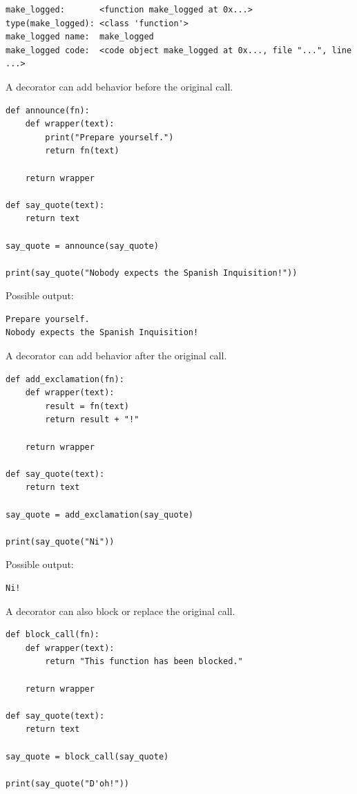 \begin{verbatim}
make_logged:       <function make_logged at 0x...>
type(make_logged): <class 'function'>
make_logged name:  make_logged
make_logged code:  <code object make_logged at 0x..., file "...", line ...>
\end{verbatim}

A decorator can add behavior before the original call.

\begin{verbatim}
def announce(fn):
    def wrapper(text):
        print("Prepare yourself.")
        return fn(text)

    return wrapper

def say_quote(text):
    return text

say_quote = announce(say_quote)

print(say_quote("Nobody expects the Spanish Inquisition!"))
\end{verbatim}

Possible output:

\begin{verbatim}
Prepare yourself.
Nobody expects the Spanish Inquisition!
\end{verbatim}

A decorator can add behavior after the original call.

\begin{verbatim}
def add_exclamation(fn):
    def wrapper(text):
        result = fn(text)
        return result + "!"

    return wrapper

def say_quote(text):
    return text

say_quote = add_exclamation(say_quote)

print(say_quote("Ni"))
\end{verbatim}

Possible output:

\begin{verbatim}
Ni!
\end{verbatim}

A decorator can also block or replace the original call.

\begin{verbatim}
def block_call(fn):
    def wrapper(text):
        return "This function has been blocked."

    return wrapper

def say_quote(text):
    return text

say_quote = block_call(say_quote)

print(say_quote("D'oh!"))
\end{verbatim}

